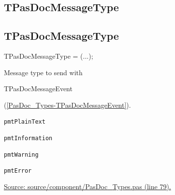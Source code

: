 \documentclass{report}
\newif\ifpdf
\begin{document}
\subsection*{\large{\textbf{TPasDocMessageType}}\normalsize\hspace{1ex}\hrulefill}
\else
\subsection*{TPasDocMessageType}
\fi
\label{PasDoc_Types-TPasDocMessageType}
\begin{list}{}{
\setlength{\itemindent}{0cm}
\setlength{\listparindent}{0cm}
\setlength{\leftmargin}{\evensidemargin}
\addtolength{\leftmargin}{\tmplength}
\settowidth{\labelsep}{X}
\addtolength{\leftmargin}{\labelsep}
\setlength{\labelwidth}{\tmplength}
}
\item[\textbf{Declaration}\hfill]
\ifpdf
\begin{flushleft}
\fi
\begin{ttfamily}
TPasDocMessageType = (...);\end{ttfamily}

\ifpdf
\end{flushleft}
\fi

\par
\item[\textbf{Description}]
Message type to send with \begin{ttfamily}TPasDocMessageEvent\end{ttfamily}(\ref{PasDoc_Types-TPasDocMessageEvent}).\item[\textbf{Values}]
\begin{description}
\item[\texttt{pmtPlainText}] \label{PasDoc_Types-pmtPlainText}
\index{}
 
\item[\texttt{pmtInformation}] \label{PasDoc_Types-pmtInformation}
\index{}
 
\item[\texttt{pmtWarning}] \label{PasDoc_Types-pmtWarning}
\index{}
 
\item[\texttt{pmtError}] \label{PasDoc_Types-pmtError}
\index{}
 
\end{description}
\par
\href{https://github.com/pasdoc/pasdoc/blob/master/source/component/PasDoc_Types.pas#L79}{Source: source/component/PasDoc{\_}Types.pas (line 79).}

\end{list}
\ifpdf
\end{document}
